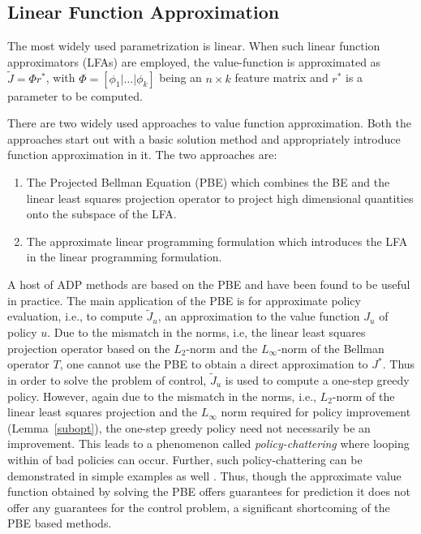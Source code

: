 \subsection{Linear Function Approximation}
The most widely used parametrization is linear. 
When such linear function approximators (LFAs) are employed,  
	the value-function is approximated as $\tilde{J}=\Phi r^*$, 
	with $\Phi=[\phi_1|\ldots|\phi_k]$ being an $n\times k$ feature matrix and $r^*$ is a
	parameter to be computed.

There are two widely used approaches to value function approximation. 
Both the approaches start out with a basic solution method and appropriately introduce function approximation in it. 
The two approaches are:
\begin{enumerate}
\item The Projected Bellman Equation (PBE) which combines the BE and the linear least squares projection operator to project high dimensional quantities onto the subspace of the LFA.
\item The approximate linear programming formulation which introduces the LFA in the linear programming formulation. 
\end{enumerate}
A host of ADP methods are based on the PBE and have been found to be useful in practice. 
The main application of the PBE is for approximate policy evaluation, 
i.e., to compute $\tilde{J}_u$, an approximation to the value function $J_u$ of policy $u$. 
Due to the mismatch in the norms, 
	i.e, the linear least squares projection operator based on the $L_2$-norm 
	and the $L_\infty$-norm of the Bellman operator $T$, 
	one cannot use the PBE to obtain a direct approximation to $J^*$. 
Thus in order to solve the problem of control, $\tilde{J}_u$ is used to compute a one-step greedy policy. 
However, again due to the mismatch in the norms, 
	i.e., $L_2$-norm of the linear least squares projection 
	and the $L_\infty$ norm required for policy improvement (Lemma~\ref{subopt}), 
	the one-step greedy policy need not necessarily be an improvement. 
	This leads to a phenomenon called \emph{policy-chattering} \cite{dpchapter} 
	where looping within of bad policies can occur. 
	Further, such policy-chattering can be demonstrated in simple examples as well \cite{dpchapter}. 
	Thus, though the approximate value function obtained by solving the PBE offers guarantees 
	for prediction it does not offer any guarantees for the control problem, 
	a significant shortcoming of the PBE based methods. 

